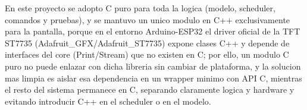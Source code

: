 \documentclass[11pt,a4paper]{article}
\begin{document}
\noindent
En este proyecto se adopto C puro para toda la logica (modelo, scheduler, comandos y pruebas), y se mantuvo un unico modulo en C++ exclusivamente para la pantalla, porque en el entorno Arduino-ESP32 el driver oficial de la TFT ST7735 (Adafruit_GFX/Adafruit_ST7735) expone clases C++ y depende de interfaces del core (Print/Stream) que no existen en C; por ello, un modulo C puro no puede enlazar con dicha libreria sin cambiar de plataforma, y la solucion mas limpia es aislar esa dependencia en un wrapper minimo con API C, mientras el resto del sistema permanece en C, separando claramente logica y hardware y evitando introducir C++ en el scheduler o en el modelo.
\end{document}
